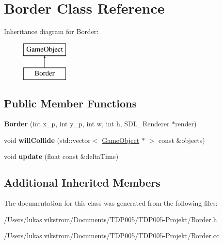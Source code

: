 \hypertarget{class_border}{}\section{Border Class Reference}
\label{class_border}
Inheritance diagram for Border\+:\begin{figure}[H]
\begin{center}
\leavevmode
\includegraphics[height=2.000000cm]{class_border}
\end{center}
\end{figure}
\subsection*{Public Member Functions}
\begin{DoxyCompactItemize}
\item 
\hypertarget{class_border_a7eb54bc76259cb052bddf040f3f326c8}{}{\bfseries Border} (int x\+\_\+p, int y\+\_\+p, int w, int h, S\+D\+L\+\_\+\+Renderer $\ast$render)\label{class_border_a7eb54bc76259cb052bddf040f3f326c8}

\item 
\hypertarget{class_border_ab0fde818fc04af8ded1a0f14faf72bb0}{}void {\bfseries will\+Collide} (std\+::vector$<$ \hyperlink{class_game_object}{Game\+Object} $\ast$ $>$ const \&objects)\label{class_border_ab0fde818fc04af8ded1a0f14faf72bb0}

\item 
\hypertarget{class_border_af57e352dd3d0c47c27897161a59ce52b}{}void {\bfseries update} (float const \&delta\+Time)\label{class_border_af57e352dd3d0c47c27897161a59ce52b}

\end{DoxyCompactItemize}
\subsection*{Additional Inherited Members}


The documentation for this class was generated from the following files\+:\begin{DoxyCompactItemize}
\item 
/\+Users/lukas.\+vikstrom/\+Documents/\+T\+D\+P005/\+T\+D\+P005-\/\+Projekt/Border.\+h\item 
/\+Users/lukas.\+vikstrom/\+Documents/\+T\+D\+P005/\+T\+D\+P005-\/\+Projekt/Border.\+cc\end{DoxyCompactItemize}
